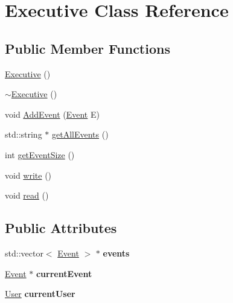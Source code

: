 \hypertarget{class_executive}{}\section{Executive Class Reference}
\label{class_executive}
\subsection*{Public Member Functions}
\begin{DoxyCompactItemize}
\item 
\mbox{\hyperlink{class_executive_ad870c1d741f1f313eb0c5a8336f8af6b}{Executive}} ()
\item 
\mbox{\hyperlink{class_executive_a4ce80c499f7640b1770ade77cf56d965}{$\sim$\+Executive}} ()
\item 
void \mbox{\hyperlink{class_executive_aa6ef4869740ffb4ad00da8e03524b757}{Add\+Event}} (\mbox{\hyperlink{class_event}{Event}} E)
\item 
std\+::string $\ast$ \mbox{\hyperlink{class_executive_a55055e17ac87cc21a81ce4e15fe7cf50}{get\+All\+Events}} ()
\item 
int \mbox{\hyperlink{class_executive_a325d611b8cd579647ee657c69560f28a}{get\+Event\+Size}} ()
\item 
void \mbox{\hyperlink{class_executive_a49841644378cd9bb4b8c1cc2eee04003}{write}} ()
\item 
void \mbox{\hyperlink{class_executive_a222ab3a86234f7476e769a285bf566a4}{read}} ()
\end{DoxyCompactItemize}
\subsection*{Public Attributes}
\begin{DoxyCompactItemize}
\item 
\mbox{\label{class_executive_a663f90e8caaf940c1dd3b6fdb6efef29}} 
std\+::vector$<$ \mbox{\hyperlink{class_event}{Event}} $>$ $\ast$ {\bfseries events}
\item 
\mbox{\label{class_executive_ad46173bff2dd82dd8fdb173d3a42135d}} 
\mbox{\hyperlink{class_event}{Event}} $\ast$ {\bfseries current\+Event}
\item 
\mbox{\label{class_executive_a6396a22945149d9e698ac1e5d8312d93}} 
\mbox{\hyperlink{class_user}{User}} {\bfseries current\+User}
\end{DoxyCompactItemize}


